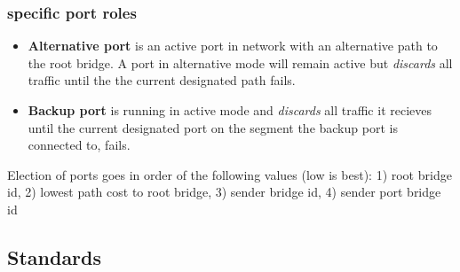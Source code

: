 \subsubsection{specific port roles}
\begin{itemize}
    \item \textbf{Alternative port} is an active port in network with an alternative path to the root bridge. A port in alternative mode will remain active but \textit{discards} all traffic until the the current designated path fails.
    \item \textbf{Backup port} is running in active mode and \textit{discards} all traffic it recieves until the current designated port on the segment the backup port is connected to, fails.
\end{itemize}

Election of ports goes in order of the following values (low is best): 1) root bridge id, 2) lowest path cost to root bridge, 3) sender bridge id, 4) sender port bridge id


\subsection{Standards}

